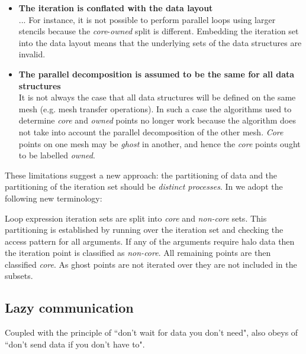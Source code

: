 \documentclass[thesis]{subfiles}
\begin{document}
\begin{itemize}
  \item
    \textbf{The iteration is conflated with the data layout}\\
    ...
    For instance, it is not possible to perform parallel loops using larger stencils because the \textit{core}-\textit{owned} split is different.
    Embedding the iteration set into the data layout means that the underlying sets of the data structures are invalid.

  \item
    \textbf{The parallel decomposition is assumed to be the same for all data structures}\\
    It is not always the case that all data structures will be defined on the same mesh (e.g. mesh transfer operations).
    In such a case the algorithms used to determine \textit{core} and \textit{owned} points no longer work because the algorithm does not take into account the parallel decomposition of the other mesh.
    \textit{Core} points on one mesh may be \textit{ghost} in another, and hence the \textit{core} points ought to be labelled \textit{owned}.
\end{itemize}

These limitations suggest a new approach: the partitioning of data and the partitioning of the iteration set should be \textit{distinct processes}.
In  we adopt the following new terminology:


Loop expression iteration sets are split into \textit{core} and \textit{non-core} sets.
This partitioning is established by running over the iteration set and checking the access pattern for all arguments.
If any of the arguments require halo data then the iteration point is classified as \textit{non-core}.
All remaining points are then classified \textit{core}.
As ghost points are not iterated over they are not included in the subsets.

\subsection{Lazy communication}

Coupled with the principle of ``don't wait for data you don't need",  also obeys of ``don't send data if you don't have to".

\end{document}
